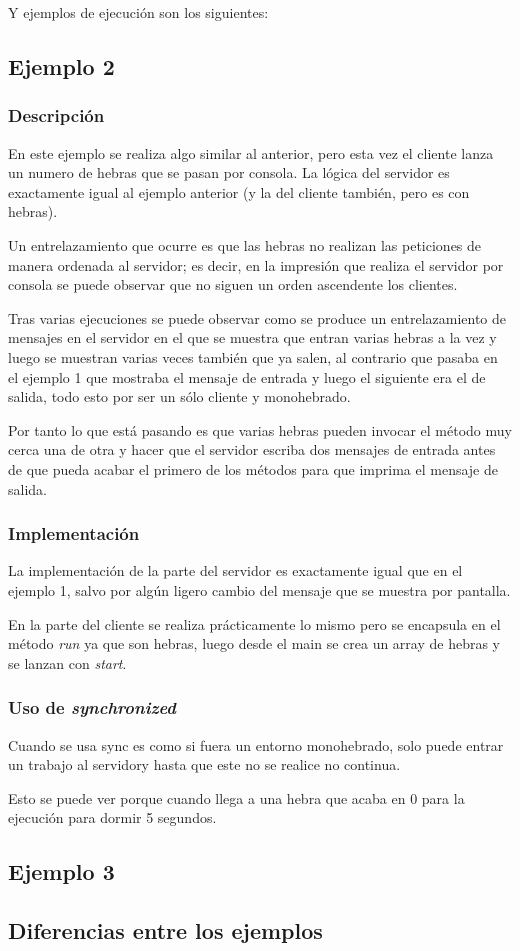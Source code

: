 \documentclass{article}
\begin{document}
Y ejemplos de ejecución son los siguientes:



\subsection{Ejemplo 2}
\subsubsection{Descripción}
En este ejemplo se realiza algo similar al anterior, pero esta vez el cliente lanza un numero de hebras que se pasan por consola. La lógica del servidor es exactamente igual al ejemplo anterior (y la del cliente también, pero es con hebras).

Un entrelazamiento que ocurre es que las hebras no realizan las peticiones de manera ordenada al servidor; es decir, en la impresión que realiza el servidor por consola se puede observar que no siguen un orden ascendente los clientes.

Tras varias ejecuciones se puede observar como se produce un entrelazamiento de mensajes en el servidor en el que se muestra que entran varias hebras a la vez y luego se muestran varias veces también que ya salen, al contrario que pasaba en el ejemplo 1 que mostraba el mensaje de entrada y luego el siguiente era el de salida, todo esto por ser un sólo cliente y monohebrado.


Por tanto lo que está pasando es que varias hebras pueden invocar el método muy cerca una de otra y hacer que el servidor escriba dos mensajes de entrada antes de que pueda acabar el primero de los métodos para que imprima el mensaje de salida.

\subsubsection{Implementación}
La implementación de la parte del servidor es exactamente igual que en el ejemplo 1, salvo por algún ligero cambio del mensaje que se muestra por pantalla.


En la parte del cliente se realiza prácticamente lo mismo pero se encapsula en el método \textit{run} ya que son hebras, luego desde el main se crea un array de hebras y se lanzan con \textit{start}.

\subsubsection{Uso de \textit{synchronized}}
Cuando se usa sync es como si fuera un entorno monohebrado, solo puede entrar un trabajo al servidory hasta que este no se realice no continua.

Esto se puede ver porque cuando llega a una hebra que acaba en 0 para la ejecución para dormir 5 segundos.

\subsection{Ejemplo 3}

\subsection{Diferencias entre los ejemplos}
\end{document}
